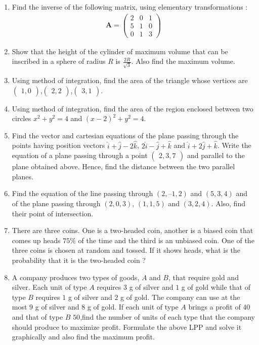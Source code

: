 \documentclass[12pt,-letter paper]{article}
\providecommand{\brak}[1]{\ensuremath{\left(#1\right)}}
\theoremstyle{remark}
\newcommand{\myvec}[1]{\ensuremath{\begin{pmatrix}#1\end{pmatrix}}}
\let\vec\mathbf
\begin{document}
\begin{enumerate}
        \item Find the inverse of the following matrix, using elementary transformations :
                \begin{align*}
                {\vec{A}} = \myvec{2&0&1\\5&1&0\\ 0&1&3}
                \end{align*}
                
        \item Show that the height of the cylinder of maximum volume that can be inscribed in a sphere of radius $R$ is $\frac{2R}{\sqrt{3}}$. Also find the maximum volume.
        
        \item Using method of integration, find the area of the triangle whose vertices are $\myvec{1,0}$,$\myvec{2,2}$,$\myvec{3,1}$.
        
        \item Using method of integration, find the area of the region enclosed between two circles ${x^2+y^2=4}$ and $\brak{x-2}^2+{y^2}=4$.
        
        \item Find the vector and cartesian equations of the plane passing through the points having position vectors $\hat{i}+\hat{j}-2\hat{k}$, $2\hat{i}-\hat{j}+\hat{k}$ and $\hat{i}+2\hat{j}+\hat{k}$. Write the equation of a plane passing through a point \myvec{2, 3, 7} and parallel to the plane obtained above. Hence, find the distance between the two parallel planes.
        
        \item Find the equation of the line passing through \brak{2, – 1, 2} and \brak{5, 3, 4} and of the plane passing through \brak{2, 0, 3}, \brak{1, 1, 5} and \brak{3, 2, 4}. Also, find their point of intersection.

\item There are three coins. One is a two-headed coin, another is a biased coin that comes up heads $75\%$ of the time and the third is an unbiased coin. One of the three coins is chosen at random and tossed. If it shows heads, what is the probability that it is the two-headed coin ?

\item A company produces two types of goods, $A$ and $B$, that require gold and silver. Each unit of type $A$ requires $3$ g of silver and $1$ g of gold while that of type $B$ requires $1$ g of silver and $2$ g of gold. The company can use at the most $9$ g of silver and $8$ g of gold. If each unit of type $A$ brings a profit of \rupee $40$ and that of type $B$ \rupee $50$,find the number of units of each type that the company should produce to maximize profit. Formulate the above LPP and solve it graphically and also find the maximum profit.


\end{enumerate}
\end{document}
